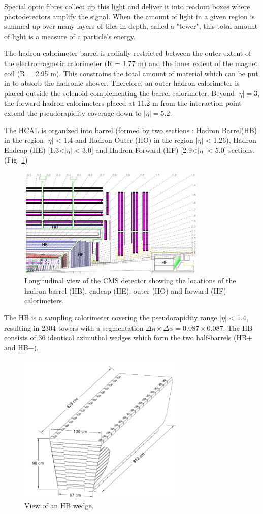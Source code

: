 Special optic fibres collect up this light and deliver it into readout boxes where photodetectors amplify the signal. When the amount of light in a given region is summed up over many layers of tiles in depth, called a "tower", this total amount of light is a measure of a particle’s energy. 

The hadron calorimeter barrel is radially restricted between the outer extent of the electromagnetic calorimeter (R = 1.77 m) and the inner extent of the magnet coil (R = 2.95 m). This constrains the total amount of material which can be put in to absorb the hadronic shower. Therefore, an outer hadron calorimeter is placed outside the solenoid complementing the barrel calorimeter. Beyond $|\eta| = 3$, the forward hadron calorimeters placed at 11.2 m from the interaction point extend the pseudorapidity coverage down to $|\eta| = 5.2$. 

The HCAL is organized into barrel (formed by two sections : Hadron Barrel(HB) in the region $|\eta|$ < 1.4 and Hadron Outer (HO) in the region $|\eta|$ < 1.26), Hadron Endcap (HE) [1.3<$|\eta|$ < 3.0]  and Hadron Forward (HF) [2.9<$|\eta|$ < 5.0]  sections.(Fig. \ref{fig:hcal1})
\begin{figure}[H]
  \centering
\includegraphics[width=9cm]{CMS_chapter_plots/hcal1}
  \caption{Longitudinal view of the CMS detector showing the locations of the hadron barrel
  (HB), endcap (HE), outer (HO) and forward (HF) calorimeters. \label{fig:hcal1}}
\end{figure}

The HB is a sampling calorimeter covering the pseudorapidity range $|\eta|$ < 1.4, resulting in 2304 towers with a segmentation $\Delta\eta\times\Delta\phi=0.087\times 0.087$.
The HB consists of 36 identical azimuthal wedges which form the two half-barrels (HB$+$ and HB$-$).
\begin{figure}[H]
  \centering
\includegraphics[width=8cm]{CMS_chapter_plots/hcal3}
  \caption{View of an HB wedge. \label{fig:hcal3}}
\end{figure}

